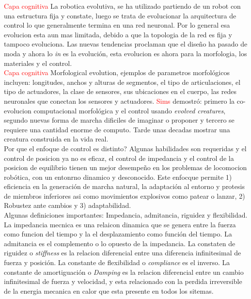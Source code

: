 \documentclass[10pt,onecolumn,twoside,letterpaper]{article}
\begin{document}
\textcolor{red}{Capa cognitiva} La robotica evolutiva, se ha utilizado partiendo de un robot con una estructura fija y constate, luego se trata de evolucionar la arquitectura de control lo que generalmente termina en una red neuronal. Por lo general esa evolucion esta aun mas limitada, debido a que la topologia de la red es fija y tampoco evoluciona. Las nuevas tendencias proclaman que el dise\~no ha pasado de moda y ahora lo \emph{in} es la evoluci\'on, esta evolucion es ahora para la morfologia, los materiales y el control.\cite{Pfeifer2007}\\
\textcolor{red}{Capa cognitiva} Morfological evolution, ejemplos de parametros morfol\'ogicos incluyen: longitudes, anchos y alturas de segmentos, el tipo de articulaciones, el tipo de actuadores, la clase de sensores, sus ubicaciones en el cuerpo, las redes neuronales que conectan los sensores y actuadores. \textcolor{red}{Sims} demostr\'o: primero la co-evolucion computacional morfol\'ogica y el control usando \emph{evolved creatures}, segundo nuevas forma de marcha dificiles de imaginar o proponer y tercero se requiere una cantidad enorme de computo. Tarde unas decadas mostrar una creatura construida en la vida real.\cite{Pfeifer2007}\\
Por que el enfoque de control es distinto? Algunas habilidades son requeridas y el control de posicion ya no es eficaz, el control de impedancia y el control de la posicion de equilibrio tienen un mejor desempe\~no en los problemas de locomocion rob\'otica, con un entonrno dinamico y desconocido. Este enfocque permite 1) eficiencia en la generaci\'on de marcha natural, la adaptaci\'on al entorno y protesis de miembros inferiores asi como movimientos explosivos como patear o lanzar, 2) Robustez ante cambios y 3) adaptabilidad.\cite{Vanderborght2013}\\
Algunas definiciones importantes: Impedancia, admitancia, riguidez y flexibilidad. La impedancia mecnica es una relaicon dinamica que se genera entre la fuerza como funcion del tiempo y la el desplazamiento como funci\'on del tiempo. La admitancia es el complemento o lo opuesto de la impedancia. La constaten de riguidez o \emph{stiffness} es la relacion diferencial entre una diferencia infinitesimal de fuerza y posici\'on. La constante de flexibilidad o \emph{compliance} es el inverso. La constante de amortiguaci\'on o \emph{Damping} es la relacion diferencial entre un cambio infinitesimal de fuerza y velocidad, y esta relacionado con la perdida irreversible de la energia mecanica en calor que esta presente en todos los sitemas.\cite{Vanderborght2013}\\
\end{document}
